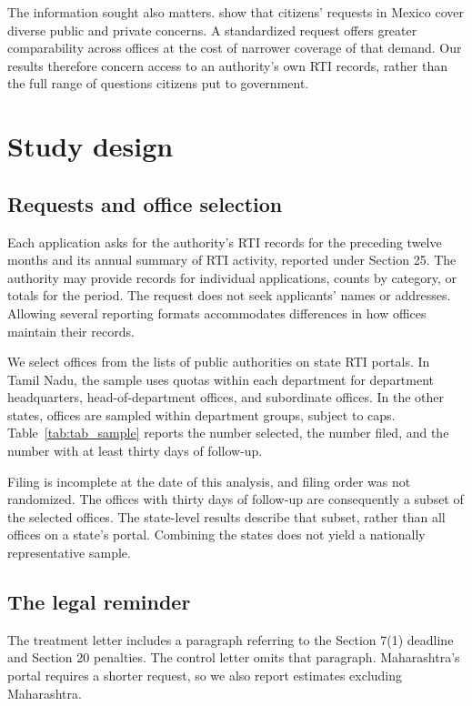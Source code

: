 \documentclass[11pt]{article}
\begin{document}
The information sought also matters. \citet{berliner2018} show that citizens' requests in Mexico cover diverse public and private concerns. A standardized request offers greater comparability across offices at the cost of narrower coverage of that demand. Our results therefore concern access to an authority's own RTI records, rather than the full range of questions citizens put to government.

\section{Study design}
\subsection{Requests and office selection}
Each application asks for the authority's RTI records for the preceding twelve months and its annual summary of RTI activity, reported under Section 25. The authority may provide records for individual applications, counts by category, or totals for the period. The request does not seek applicants' names or addresses. Allowing several reporting formats accommodates differences in how offices maintain their records.

We select offices from the lists of public authorities on state RTI portals. In Tamil Nadu, the sample uses quotas within each department for department headquarters, head-of-department offices, and subordinate offices. In the other states, offices are sampled within department groups, subject to caps. Table~\ref{tab:tab_sample} reports the number selected, the number filed, and the number with at least thirty days of follow-up.

Filing is incomplete at the date of this analysis, and filing order was not randomized. The offices with thirty days of follow-up are consequently a subset of the selected offices. The state-level results describe that subset, rather than all offices on a state's portal. Combining the states does not yield a nationally representative sample.

\FloatBarrier

\subsection{The legal reminder}
The treatment letter includes a paragraph referring to the Section 7(1) deadline and Section 20 penalties. The control letter omits that paragraph. Maharashtra's portal requires a shorter request, so we also report estimates excluding Maharashtra.
\end{document}
